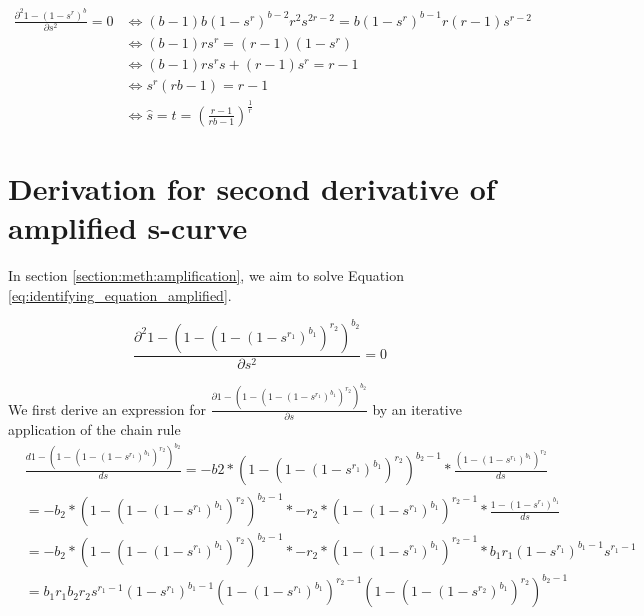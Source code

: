 \begin{align*}
    \frac{\partial^2 1 - (1-s^r)^b }{\partial s^2} = 0 &\Leftrightarrow (b-1) b(1-s^r)^{b - 2 }r^2s^{2r-2} = b(1-s^r)^{b -1 } r(r-1)s^{r-2} \\
                                        &\Leftrightarrow (b-1)rs^{r} = (r-1)(1 - s^r) \\
                                        &\Leftrightarrow (b-1)rs^{r}s + (r-1)s^r = r - 1 \\
                                        &\Leftrightarrow s^{r}(rb-1) = r -1 \\
                                        &\Leftrightarrow \hat{s} = t = (\frac{r-1}{rb-1})^{\frac{1}{r}}
\end{align*}
\section{Derivation for second derivative of amplified s-curve}
\label{appendix:derivation_second_derivative_s_curve}
In section \ref{section:meth:amplification}, we aim to solve Equation \ref{eq:identifying_equation_amplified}.

\begin{equation}
    \frac{\partial^2 1 - (1- (1 - (1-s^{r_1})^{b_1})^{r_2})^{b_2} }{\partial s^2} = 0
\end{equation}

We first derive an expression for  $\frac{\partial 1 - (1- (1 - (1-s^{r_1})^{b_1})^{r_2})^{b_2}}{\partial s}$ by an iterative application of the chain rule
\begin{align}
    &\frac{d 1 - (1- (1 - (1-s^{r_1})^{b_1})^{r_2})^{b_2}}{ds} = -b2 *(1-(1-(1-s^{r_1})^{b_1})^{r_2})^{b_2 - 1} * \frac{(1-(1-s^{r_1})^{b_1})^{r_2}}{ds}\\
    &= -b_2 *(1-(1-(1-s^{r_1})^{b_1})^{r_2})^{b_2 - 1} * - r_2 * (1-(1-s^{r_1})^{b_1})^{r_2 - 1} *  \frac{1-(1-s^{r_1})^{b_1}}{ds} \nonumber  \\
    &= -b_2 *(1-(1-(1-s^{r_1})^{b_1})^{r_2})^{b_2 - 1} * - r_2 * (1-(1-s^{r_1})^{b_1})^{r_2 - 1} * b_1r_1(1-s^{r_1})^{b_1-1}s^{r_1-1} \nonumber\\                                                     
    &= b_1r_1b_2r_2s^{r_1-1}(1-s^{r_1})^{b_1-1}(1-(1-s^{r_1})^{b_1})^{r_2-1}(1-(1-(1-s^{r_2})^{b_1})^{r_2})^{b_2-1} \nonumber
\label{appendix:derivation_first_deriv_ampl_s_curve}
\end{align}

